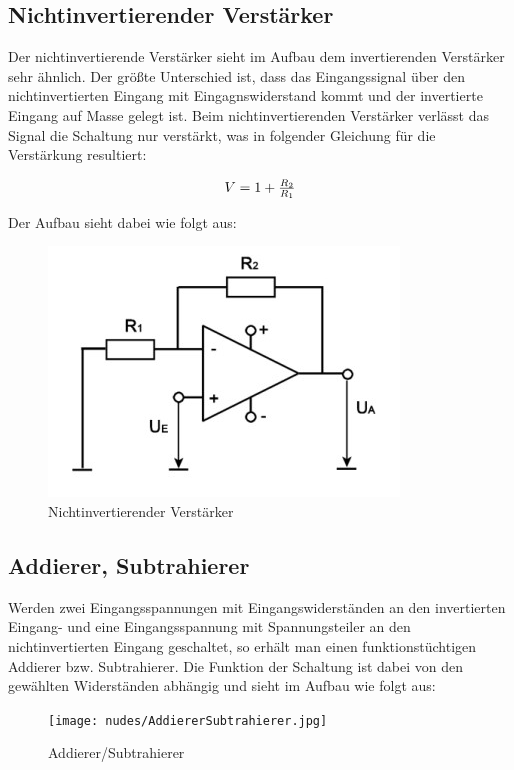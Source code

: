 \documentclass[12pt,a4paper,twoside]{article}
\begin{document}
\subsection{Nichtinvertierender Verstärker}

Der nichtinvertierende Verstärker sieht im Aufbau dem invertierenden Verstärker sehr ähnlich. Der größte Unterschied ist, dass das Eingangssignal über den nichtinvertierten Eingang mit Eingagnswiderstand kommt und der invertierte Eingang auf Masse gelegt ist.
Beim nichtinvertierenden Verstärker verlässt das Signal die Schaltung nur verstärkt, was in folgender Gleichung für die Verstärkung resultiert:

\begin{equation}
    \label{eq:NichtinvertierenderVerstärkerVerstärkung}
    \centerline{$V=1 + \frac{R_{2}}{R_{1}}$}
\end{equation}

\noindent
Der Aufbau sieht dabei wie folgt aus:

\begin{figure}[H]
    \centering
    \includegraphics[width=0.3\linewidth]{nudes/Nichtinvertierender Verstärker.jpg}
    \caption{Nichtinvertierender Verstärker \cite{teachcenter2}}
    \label{fig:NichtInvertierenderVerstärker}
\end{figure}


\subsection{Addierer, Subtrahierer}

Werden zwei Eingangsspannungen mit Eingangswiderständen an den invertierten Eingang- und eine Eingangsspannung mit Spannungsteiler an den nichtinvertierten Eingang geschaltet, so erhält man einen funktionstüchtigen Addierer bzw. Subtrahierer.
Die Funktion der Schaltung ist dabei von den gewählten Widerständen abhängig und sieht im Aufbau wie folgt aus:

\begin{figure}[H]
    \centering
    \texttt{[image: nudes/AddiererSubtrahierer.jpg]}
    \caption{Addierer/Subtrahierer \cite{teachcenter2}}
    \label{fig:AddiererSubtrahierer}
\end{figure}
\end{document}
